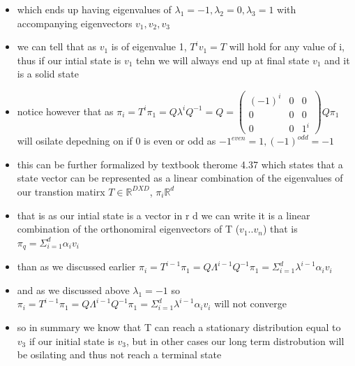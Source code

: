 \documentclass[10pt]{article}
\begin{document}
\begin{itemize}
\item which ends up having eigenvalues of $\lambda_1=-1,\lambda_2=0,\lambda_3=1$ with accompanying eigenvectors $v_1,v_2,v_3$
\item we can tell that as $v_1$ is of eigenvalue 1, $T^{i}v_1=T$ will hold for any value of i, thus if our intial state is $v_1$ tehn we will always end up at final state $v_1$ and it is a solid state 
\item notice however that as $\pi_i=T^{i}\pi_1=Q\lambda^{i}Q^{-1}=Q=\begin{pmatrix}
    (-1)^{i}&0&0\\0&0&0\\0&0&1^{i}
\end{pmatrix}Q\pi_1$ will osilate depedning on if 0 is even or odd as $-1^{even}=1,(-1)^{odd}=-1$
\item this can be further formalized by textbook therome 4.37 which states that a state vector can be represented as a linear combination of the eigenvalues of our transtion matirx $T\in\mathbb{R}^{DXD}$, $\pi_i\mathbb{R}^d$ 
\item that is as our intial state is a vector in r d we can write it is a linear combination of the orthonomiral eigenvectors of T ($v_1..v_n$) that is  $\pi_q=\Sigma_{i=1}^{d}\alpha_iv_i$
\item than as we discussed earlier $\pi_i=T^{i-1}\pi_1=Q\Lambda^{i-1}Q^{-1}\pi_1=\Sigma_{i=1}^{d}\lambda^{i-1}\alpha_iv_i$
\item and as we discussed above $\lambda_1=-1$ so $\pi_i=T^{i-1}\pi_1=Q\Lambda^{i-1}Q^{-1}\pi_1=\Sigma_{i=1}^{d}\lambda^{i-1}\alpha_iv_i$ will not converge 
\item so in summary we know that T can reach a stationary distribution equal to $v_3$ if our initial state is $v_3$, but in other cases our long term distrobution will be osilating and thus not reach a terminal state
\end{itemize} 
\end{document}
